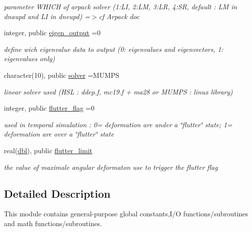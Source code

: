 \begin{DoxyCompactItemize}
\begin{DoxyCompactList}\small\item\em parameter W\+H\+I\+CH of arpack solver (1\+:LI, 2\+:LM, 3\+:LR, 4\+:SR, default \+: LM in dnaupd and LI in dneupd) =$>$cf Arpack doc \end{DoxyCompactList}\item 
integer, public \hyperlink{namespaceglobaldatafun_a312b192a05c2e5b3dd301528abdba07c}{eigen\+\_\+output} =0
\begin{DoxyCompactList}\small\item\em define wich eigenvalue data to output (0\+: eigenvalues and eigenvectors, 1\+: eigenvalues only) \end{DoxyCompactList}\item 
character(10), public \hyperlink{namespaceglobaldatafun_a895a1e10c59021323fcf518893f6c0de}{solver} =\textquotesingle{}M\+U\+M\+PS\textquotesingle{}
\begin{DoxyCompactList}\small\item\em linear solver used (H\+SL \+: ddep.\+f, mc19.\+f + ma28 or M\+U\+M\+PS \+: linux library) \end{DoxyCompactList}\item 
integer, public \hyperlink{namespaceglobaldatafun_a71be24aec97056093e319698ed6df6fd}{flutter\+\_\+flag} =0
\begin{DoxyCompactList}\small\item\em used in temporal simulation \+: 0= deformation are under a \char`\"{}flutter\char`\"{} state; 1= deformation are over a \char`\"{}flutter\char`\"{} state \end{DoxyCompactList}\item 
real(\hyperlink{namespaceglobaldatafun_a5008801201dd34f2af8eae07756befb4}{dbl}), public \hyperlink{namespaceglobaldatafun_a00437dc044a340393bafc8c15d696e7a}{flutter\+\_\+limit}
\begin{DoxyCompactList}\small\item\em the value of maximale angular deformaton use to trigger the flutter flag \end{DoxyCompactList}\end{DoxyCompactItemize}


\subsection{Detailed Description}
This module contains general-\/purpose global constants,I/O functions/subroutines and math functions/subroutines. 

